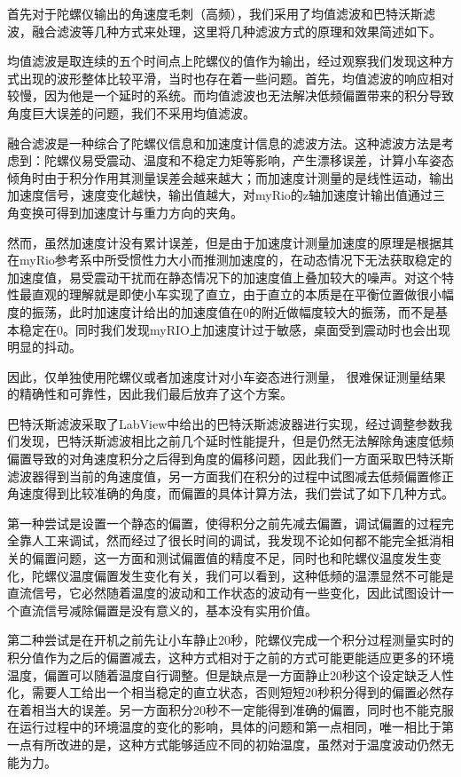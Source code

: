 \documentclass[UTF8,a4paper]{paper}
\begin{document}
首先对于陀螺仪输出的角速度毛刺（高频），我们采用了均值滤波和巴特沃斯滤波，融合滤波等几种方式来处理，这里将几种滤波方式的原理和效果简述如下。

均值滤波是取连续的五个时间点上陀螺仪的值作为输出，经过观察我们发现这种方式出现的波形整体比较平滑，当时也存在着一些问题。首先，均值滤波的响应相对较慢，因为他是一个延时的系统。而均值滤波也无法解决低频偏置带来的积分导致角度巨大误差的问题，我们不采用均值滤波。

融合滤波是一种综合了陀螺仪信息和加速度计信息的滤波方法。这种滤波方法是考虑到：陀螺仪易受震动、温度和不稳定力矩等影响，产生漂移误差，计算小车姿态倾角时由于积分作用其测量误差会越来越大；而加速度计测量的是线性运动，输出加速度信号，速度变化越快，输出值越大，对myRio的z轴加速度计输出值通过三角变换可得到加速度计与重力方向的夹角。

然而，虽然加速度计没有累计误差，但是由于加速度计测量加速度的原理是根据其在myRio参考系中所受惯性力大小而推测加速度的，在动态情况下无法获取稳定的加速度值，易受震动干扰而在静态情况下的加速度值上叠加较大的噪声。对这个特性最直观的理解就是即使小车实现了直立，由于直立的本质是在平衡位置做很小幅度的振荡，此时加速度计给出的加速度值在0的附近做幅度较大的振荡，而不是基本稳定在0。同时我们发现myRIO上加速度计过于敏感，桌面受到震动时也会出现明显的抖动。

因此，仅单独使用陀螺仪或者加速度计对小车姿态进行测量， 很难保证测量结果的精确性和可靠性，因此我们最后放弃了这个方案。

巴特沃斯滤波采取了LabView中给出的巴特沃斯滤波器进行实现，经过调整参数我们发现，巴特沃斯滤波相比之前几个延时性能提升，但是仍然无法解除角速度低频偏置导致的对角速度积分之后得到角度的偏移问题，因此我们一方面采取巴特沃斯滤波器得到当前的角速度值，另一方面我们在积分的过程中试图减去低频偏置修正角速度得到比较准确的角度，而偏置的具体计算方法，我们尝试了如下几种方式。

第一种尝试是设置一个静态的偏置，使得积分之前先减去偏置，调试偏置的过程完全靠人工来调试，然而经过了很长时间的调试，我发现不论如何都不能完全抵消相关的偏置问题，这一方面和测试偏置值的精度不足，同时也和陀螺仪温度发生变化，陀螺仪温度偏置发生变化有关，我们可以看到，这种低频的温漂显然不可能是直流信号，它必然随着温度的波动和工作状态的波动有一些变化，因此试图设计一个直流信号减除偏置是没有意义的，基本没有实用价值。

第二种尝试是在开机之前先让小车静止20秒，陀螺仪完成一个积分过程测量实时的积分值作为之后的偏置减去，这种方式相对于之前的方式可能更能适应更多的环境温度，偏置可以随着温度自行调整。但是缺点是一方面静止20秒这个设定缺乏人性化，需要人工给出一个相当稳定的直立状态，否则短短20秒积分得到的偏置必然存在着相当大的误差。另一方面积分20秒不一定能得到准确的偏置，同时也不能克服在运行过程中的环境温度的变化的影响，具体的问题和第一点相同，唯一相比于第一点有所改进的是，这种方式能够适应不同的初始温度，虽然对于温度波动仍然无能为力。
\end{document}
